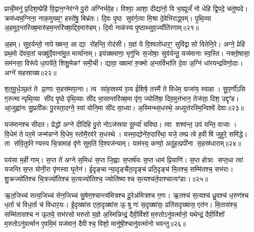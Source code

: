 {\anuvakamend[{दी॒या॒ दा॒यो ज॑यन्त्व॒मित्रा॒न्प्र च॑त्वारि॒ꣳ॒शच्च॑॥४॥}]}

प्राची॒मनु॑ प्र॒दिश॒म्प्रेहि॑ वि॒द्वान॒ग्नेर॑ग्ने पु॒रो अ॑ग्निर्भवे॒ह। विश्वा॒ आशा॒ दीद्या॑नो॒ वि भा॒ह्यूर्जं॑ नो धेहि द्वि॒पदे॒ चतु॑ष्पदे। क्रम॑ध्वम॒ग्निना॒ नाक॒मुख्य॒ꣳ॒ हस्ते॑षु॒ बिभ्र॑तः। दि॒वः पृ॒ष्ठ सुव॑र्ग॒त्वा मि॒श्रा दे॒वेभि॑राद्ध्वम्। पृ॒थि॒व्या अ॒हमुद॒न्तरि॑ख्ष॒मारु॑हम॒न्तरि॑ख्षा॒द्दिव॒मारु॑हम्। दि॒वो नाक॑स्य पृ॒ष्ठाथ्सुव॒र्ज्योति॑रगाम्॥२१॥

अ॒हम्। सुव॒र्यन्तो॒ नापेख्षन्त॒ आ द्या रो॑हन्ति॒ रोद॑सी। य॒ज्ञं ये वि॒श्वतो॑धार॒ꣳ॒ सुवि॑द्वासो वितेनि॒रे। अग्ने॒ प्रेहि॑ प्रथ॒मो दे॑वय॒तां चख्षु॑र्दे॒वाना॑मु॒त मर्त्या॑नाम्। इय॑ख्षमाणा॒ भृगु॑भिः स॒जोषाः॒ सुव॑र्यन्तु॒ यज॑मानाः स्व॒स्ति। नक्तो॒षासा॒ सम॑नसा॒ विरू॑पे धा॒पये॑ते॒ शिशु॒मेकꣳ॑ समी॒ची। द्यावा॒ ख्षामा॑ रु॒क्मो अ॒न्तर्विभा॑ति दे॒वा अ॒ग्निं धा॑रयन्द्रविणो॒दाः। अग्ने॑ सहस्राख्ष॥२२॥

श॒त॒मू॒र्ध॒ञ्छ॒तं ते प्रा॒णाः स॒हस्र॑मपा॒नाः। त्व सा॑ह॒स्रस्य॑ रा॒य ई॑शिषे॒ तस्मै॑ ते विधेम॒ वाजा॑य॒ स्वाहा। सु॒प॒र्णो॑ऽसि ग॒रुत्मान्पृथि॒व्या सी॑द पृ॒ष्ठे पृ॑थि॒व्याः सी॑द भा॒सान्तरि॑ख्ष॒मा पृ॑ण॒ ज्योति॑षा॒ दिव॒मुत्त॑भान॒ तेज॑सा॒ दिश॒ उद्दृꣳ॑ह। आ॒जुह्वा॑नः सु॒प्रती॑कः पु॒रस्ता॒दग्ने॒ स्वां योनि॒मा सी॑द सा॒ध्या। अ॒स्मिन्थ्स॒धस्थे॒ अध्युत्त॑रस्मि॒न्विश्वे॑ देवाः॥२३॥

यज॑मानश्च सीदत। प्रेद्धो॑ अग्ने दीदिहि पु॒रो नोऽज॑स्रया सू॒र्म्या॑ यविष्ठ। त्वा शश्व॑न्त॒ उप॑ यन्ति॒ वाजाः। वि॒धेम॑ ते पर॒मे जन्म॑न्नग्ने वि॒धेम॒ स्तोमै॒रव॑रे स॒धस्थे। यस्मा॒द्योने॑रु॒दारि॑था॒ यजे॒ तम्प्र त्वे ह॒वीषि॑ जुहुरे॒ समि॑द्धे। ता स॑वि॒तुर्वरेण्यस्य चि॒त्रामाहं वृ॑णे सुम॒तिं वि॒श्वज॑न्याम्। याम॑स्य॒ कण्वो॒ अदु॑ह॒त्प्रपी॑ना स॒हस्र॑धाराम्॥२४॥

पय॑सा म॒हीं गाम्। स॒प्त ते॑ अग्ने स॒मिधः॑ स॒प्त जि॒ह्वाः स॒प्तर्\mbox{}ष॑यः स॒प्त धाम॑ प्रि॒याणि॑। स॒प्त होत्राः सप्त॒धा त्वा॑ यजन्ति स॒प्त योनी॒रा पृ॑णस्वा घृ॒तेन॑। ई॒दृङ्चान्या॒दृङ्चै॑ता॒दृङ्च॑ प्रति॒दृङ्च॑ मि॒तश्च॒ सम्मि॑तश्च॒ सभ॑राः। शु॒क्रज्यो॑तिश्च चि॒त्रज्यो॑तिश्च स॒त्यज्यो॑तिश्च॒ ज्योति॑ष्माश्च स॒त्यश्च॑र्त॒पाश्चात्यꣳ॑हाः।॥२५॥

ऋ॒त॒जिच्च॑ सत्य॒जिच्च॑ सेन॒जिच्च॑ सु॒षेण॒श्चान्त्य॑मित्रश्च दू॒रेअ॑मित्रश्च ग॒णः। ऋ॒तश्च॑ स॒त्यश्च॑ ध्रु॒वश्च॑ ध॒रुण॑श्च ध॒र्ता च॑ विध॒र्ता च॑ विधार॒यः। ई॒दृख्षा॑स एता॒दृख्षा॑स ऊ॒ षु णः॑ स॒दृख्षा॑सः॒ प्रति॑सदृख्षास॒ एत॑न। मि॒तास॑श्च॒ सम्मि॑तासश्च न ऊ॒तये॒ सभ॑रसो मरुतो य॒ज्ञे अ॒स्मिन्निन्द्रं॒ दैवी॒र्विशो॑ म॒रुतोऽनु॑वर्त्मानो॒ यथेन्द्रं॒ दैवी॒र्विशो॑ म॒रुतोऽनु॑वर्त्मान ए॒वमि॒मं यज॑मानं॒ दैवीश्च॒ विशो॒ मानु॑षी॒श्चानु॑वर्त्मानो भवन्तु॥२६॥

